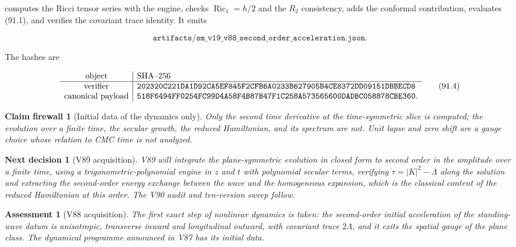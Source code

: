 \documentclass[11pt]{article}
\newtheorem{firewall}[theorem]{Claim firewall}
\newtheorem{decision}[theorem]{Next decision}
\newtheorem{assessment}[theorem]{Assessment}
\theoremstyle{remark}
\begin{document}
computes the Ricci tensor series with the engine, checks
\(\operatorname{Ric}_1=h/2\) and the \(R_2\) consistency, adds the
conformal contribution, evaluates (91.1), and verifies the covariant
trace identity.  It emits

\[
 \texttt{artifacts/sm\_v19\_v88\_second\_order\_acceleration.json}.  \tag{91.3}
\]

The hashes are

\[
\begin{array}{c|l}
\hbox{object}&\hbox{SHA--256}\\ \hline
\hbox{verifier}&
\texttt{202320C221DA1D92CA5EF845F2CFB6A0233B627905B4CE8372DD09151DBBECD8}\\
\hbox{canonical payload}&
\texttt{518F6494FF0254FC99D4A58F4B87B47F1C258A573565600DADBC058878CBE360}.
\end{array}                                                     \tag{91.4}
\]

\begin{firewall}[Initial data of the dynamics only]
\label{fire:v19v88}
Only the second time derivative at the time-symmetric slice is
computed; the evolution over a finite time, the secular growth, the
reduced Hamiltonian, and its spectrum are not.  Unit lapse and zero
shift are a gauge choice whose relation to CMC time is not analyzed.
\end{firewall}

\begin{decision}[V89 acquisition]
\label{dec:v19v88-next}
V89 will integrate the plane-symmetric evolution in closed form to
second order in the amplitude over a finite time, using a
trigonometric-polynomial engine in \(z\) and \(t\) with polynomial
secular terms, verifying \(\dot\tau=|K|^2-\Lambda\) along the solution
and extracting the second-order energy exchange between the wave and
the homogeneous expansion, which is the classical content of the
reduced Hamiltonian at this order.  The V90 audit and ten-version
sweep follow.
\end{decision}

\begin{assessment}[V88 acquisition]
\label{ass:v19v88}
The first exact step of nonlinear dynamics is taken: the second-order
initial acceleration of the standing-wave datum is anisotropic,
transverse inward and longitudinal outward, with covariant trace
\(2\Lambda\), and it exits the spatial gauge of the plane class.  The
dynamical programme announced in V87 has its initial data.
\end{assessment}
\end{document}
